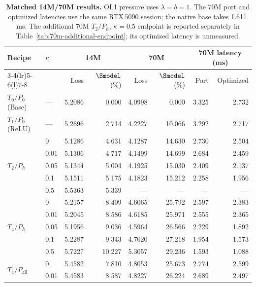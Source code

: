 \begin{table}[H]
\centering\small
\setlength{\tabcolsep}{4pt}
\renewcommand{\arraystretch}{1.02}
\caption{\textbf{Matched 14M/70M results.} OL1 pressure uses $\lambda=b=1$. The 70M port and optimized latencies use the same RTX\,5090 session; the native base takes 1.611\,ms. The additional 70M $T_2/P_h$, $\kappa=0.5$ endpoint is reported separately in Table~\ref{tab:70m-additional-endpoint}; its optimized latency is unmeasured.}
\label{tab:endpoints-14m-70m}
\begin{tabular}{@{}llrrrrrr@{}}
\toprule
\multirow{2}{*}{Recipe} & \multirow{2}{*}{$\kappa$} & \multicolumn{2}{c}{14M} & \multicolumn{2}{c}{70M} & \multicolumn{2}{c}{70M latency (ms)} \\
\cmidrule(lr){3-4}\cmidrule(lr){5-6}\cmidrule(l){7-8}
 & & Loss & $\Smodel$ (\%) & Loss & $\Smodel$ (\%) & Port & Optimized \\
\midrule
$T_{0}/P_{0}$ (Base) & --- & 5.2086 & 0.000 & 4.0998 & 0.000 & 3.325 & 2.732 \\
\midrule
$T_{1}/P_{0}$ (ReLU) & --- & 5.2696 & 2.714 & 4.2227 & 10.066 & 3.292 & 2.717 \\
\midrule
\multirow{5}{*}{$T_{2}/P_{h}$} & 0 & 5.1286 & 4.631 & 4.1287 & 14.630 & 2.730 & 2.504 \\
 & 0.01 & 5.1306 & 4.717 & 4.1499 & 14.699 & 2.684 & 2.459 \\
 & 0.05 & 5.1344 & 5.004 & 4.1925 & 15.030 & 2.409 & 2.137 \\
 & 0.1 & 5.1511 & 5.175 & 4.1823 & 15.212 & 2.258 & 1.956 \\
 & 0.5 & 5.5363 & 5.339 & --- & --- & --- & --- \\
\midrule
\multirow{5}{*}{$T_{4}/P_{h}$} & 0 & 5.2157 & 8.409 & 4.6065 & 25.792 & 2.597 & 2.383 \\
 & 0.01 & 5.2045 & 8.586 & 4.6185 & 25.971 & 2.555 & 2.365 \\
 & 0.05 & 5.1956 & 9.036 & 4.5964 & 26.566 & 2.229 & 1.892 \\
 & 0.1 & 5.2287 & 9.343 & 4.7020 & 27.218 & 1.954 & 1.573 \\
 & 0.5 & 5.7227 & 10.227 & 5.3057 & 29.236 & 1.593 & 1.088 \\
\midrule
\multirow{5}{*}{$T_{4}/P_{\mathrm{all}}$} & 0 & 5.4582 & 7.810 & 4.8053 & 25.673 & 2.774 & 2.599 \\
 & 0.01 & 5.4583 & 8.587 & 4.8227 & 26.224 & 2.689 & 2.497 \\

\end{tabular}
\end{table}
